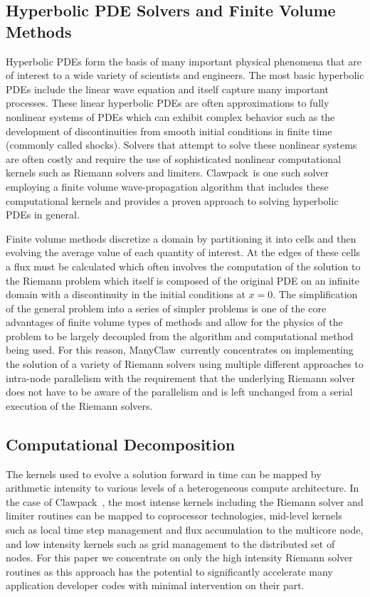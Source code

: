 \documentclass{article}
\def\clawpack{Clawpack~}
\def\manyclaw{ManyClaw~}
\begin{document}
\subsection{Hyperbolic PDE Solvers and Finite Volume Methods}

Hyperbolic PDEs form the basis of many important physical phenomena that are of
interest to a wide variety of scientists and engineers. The most basic
hyperbolic PDEs include the linear wave equation and itself capture many
important processes. These linear hyperbolic PDEs are often approximations to
fully nonlinear systems of PDEs which can exhibit complex behavior such as the
development of discontinuities from smooth initial conditions in finite time
(commonly called shocks). Solvers that attempt to solve these nonlinear systems
are often costly and require the use of sophisticated nonlinear computational
kernels such as Riemann solvers and limiters. \clawpack is one such solver
employing a finite volume wave-propagation algorithm that includes these
computational kernels and provides a proven approach to solving hyperbolic PDEs
in general.

Finite volume methods discretize a domain by partitioning it into cells and
then evolving the average value of each quantity of interest. At the edges of
these cells a flux must be calculated which often involves the computation of
the solution to the Riemann problem which itself is composed of the original
PDE on an infinite domain with a discontinuity in the initial conditions at
$x=0$. The simplification of the general problem into a series of simpler
problems is one of the core advantages of finite volume types of methods and
allow for the physics of the problem to be largely decoupled from the algorithm
and computational method being used. For this reason, \manyclaw currently
concentrates on implementing the solution of a variety of Riemann solvers using
multiple different approaches to intra-node parallelism with the requirement
that the underlying Riemann solver does not have to be aware of the parallelism
and is left unchanged from a serial execution of the Riemann solvers.

\subsection{Computational Decomposition}

The kernels used to evolve a solution forward in time can be mapped by
arithmetic intensity to various levels of a heterogeneous compute architecture.
In the case of \clawpack, the most intense kernels including the Riemann solver
and limiter routines can be mapped to coprocessor technologies, mid-level
kernels such as local time step management and flux accumulation to the
multicore node, and low intensity kernels such as grid management to the
distributed set of nodes. For this paper we concentrate on only the high
intensity Riemann solver routines as this approach has the potential to
significantly accelerate many application developer codes with minimal
intervention on their part.
\end{document}
